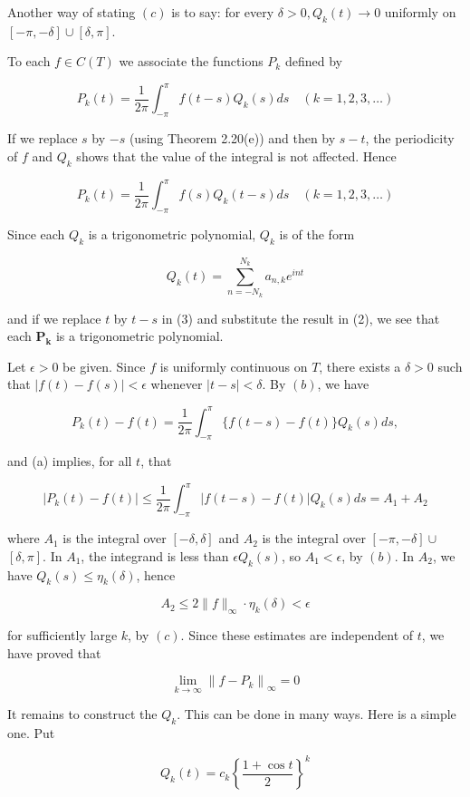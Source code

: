 \documentclass[10pt]{article}
\begin{document}
Another way of stating $(c)$ is to say: for every $\delta>0, Q_{k}(t) \rightarrow 0$ uniformly on $[-\pi,-\delta] \cup[\delta, \pi]$.

To each $f \in C(T)$ we associate the functions $P_{k}$ defined by

$$
P_{k}(t)=\frac{1}{2 \pi} \int_{-\pi}^{\pi} f(t-s) Q_{k}(s) d s \quad(k=1,2,3, \ldots)
$$

If we replace $s$ by $-s$ (using Theorem 2.20(e)) and then by $s-t$, the periodicity of $f$ and $Q_{k}$ shows that the value of the integral is not affected. Hence

$$
P_{k}(t)=\frac{1}{2 \pi} \int_{-\pi}^{\pi} f(s) Q_{k}(t-s) d s \quad(k=1,2,3, \ldots)
$$

Since each $Q_{k}$ is a trigonometric polynomial, $Q_{k}$ is of the form

$$
Q_{k}(t)=\sum_{n=-N_{k}}^{N_{k}} a_{n, k} e^{i n t}
$$

and if we replace $t$ by $t-s$ in (3) and substitute the result in (2), we see that each $\boldsymbol{P}_{\boldsymbol{k}}$ is a trigonometric polynomial.

Let $\epsilon>0$ be given. Since $f$ is uniformly continuous on $T$, there exists a $\delta>0$ such that $|f(t)-f(s)|<\epsilon$ whenever $|t-s|<\delta$. By $(b)$, we have

$$
P_{k}(t)-f(t)=\frac{1}{2 \pi} \int_{-\pi}^{\pi}\{f(t-s)-f(t)\} Q_{k}(s) d s,
$$

and (a) implies, for all $t$, that

$$
\left|P_{k}(t)-f(t)\right| \leq \frac{1}{2 \pi} \int_{-\pi}^{\pi}|f(t-s)-f(t)| Q_{k}(s) d s=A_{1}+A_{2}
$$

where $A_{1}$ is the integral over $[-\delta, \delta]$ and $A_{2}$ is the integral over $[-\pi,-\delta] \cup$ $[\delta, \pi]$. In $A_{1}$, the integrand is less than $\epsilon Q_{k}(s)$, so $A_{1}<\epsilon$, by $(b)$. In $A_{2}$, we have $Q_{k}(s) \leq \eta_{k}(\delta)$, hence

$$
A_{2} \leq 2\|f\|_{\infty} \cdot \eta_{k}(\delta)<\epsilon
$$

for sufficiently large $k$, by $(c)$. Since these estimates are independent of $t$, we have proved that

$$
\lim _{k \rightarrow \infty}\left\|f-P_{k}\right\|_{\infty}=0
$$

It remains to construct the $Q_{k}$. This can be done in many ways. Here is a simple one. Put

$$
Q_{k}(t)=c_{k}\left\{\frac{1+\cos t}{2}\right\}^{k}
$$
\end{document}
